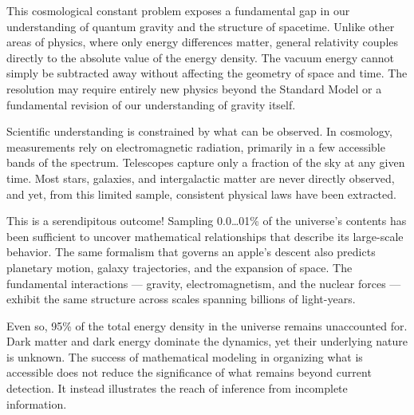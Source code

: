 This cosmological constant problem exposes a fundamental gap in our understanding of quantum gravity and the structure of spacetime. Unlike other areas of physics, where only energy differences matter, general relativity couples directly to the absolute value of the energy density. The vacuum energy cannot simply be subtracted away without affecting the geometry of space and time. The resolution may require entirely new physics beyond the Standard Model or a fundamental revision of our understanding of gravity itself.

\begin{commentary}
Scientific understanding is constrained by what can be observed. In cosmology, measurements rely on electromagnetic radiation, primarily in a few accessible bands of the spectrum. Telescopes capture only a fraction of the sky at any given time. Most stars, galaxies, and intergalactic matter are never directly observed, and yet, from this limited sample, consistent physical laws have been extracted.

This is a serendipitous outcome! Sampling 0.0\ldots01\% of the universe's contents has been sufficient to uncover mathematical relationships that describe its large-scale behavior. The same formalism that governs an apple's descent also predicts planetary motion, galaxy trajectories, and the expansion of space. The fundamental interactions — gravity, electromagnetism, and the nuclear forces — exhibit the same structure across scales spanning billions of light-years.

Even so, 95\% of the total energy density in the universe remains unaccounted for. Dark matter and dark energy dominate the dynamics, yet their underlying nature is unknown. The success of mathematical modeling in organizing what is accessible does not reduce the significance of what remains beyond current detection. It instead illustrates the reach of inference from incomplete information.

\end{commentary}

